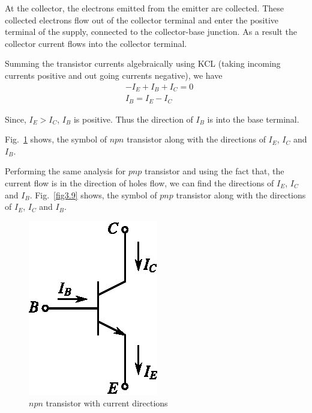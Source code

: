 At the collector, the electrons emitted from the emitter are collected. These collected electrons flow out of the collector terminal and enter the positive terminal of the supply, connected to the collector-base junction. As a result the collector current flows into the collector terminal.

Summing the transistor currents algebraically using KCL (taking incoming currents positive and out going currents negative), we have
\begin{align}
& -I_{E}+I_{B}+I_{C}=0\label{eq3.1}\\[3pt]
& I_{B}=I_{E}-I_{C}\label{eq3.2}
\end{align}

Since, $I_{E}>I_{C}$, $I_{B}$ is positive. Thus the direction of $I_{B}$ is into the base terminal.

Fig.~\ref{fig3.8} shows, the symbol of $npn$ transistor along with the directions of $I_{E}$, $I_{C}$ and $I_{B}$.

Performing the same analysis for $pnp$ transistor and using the fact that, the current flow is in the direction of holes flow, we can find the directions of $I_{E}$, $I_{C}$ and $I_{B}$. Fig.~\ref{fig3.9} shows, the symbol of $pnp$ transistor along with the directions of $I_{E}$, $I_{C}$ and $I_{B}$.
\begin{figure}[H]
\centering
\includegraphics{chap2/fig2.8.eps}
\caption{$npn$ transistor with current directions}\label{fig3.8}
\end{figure}

